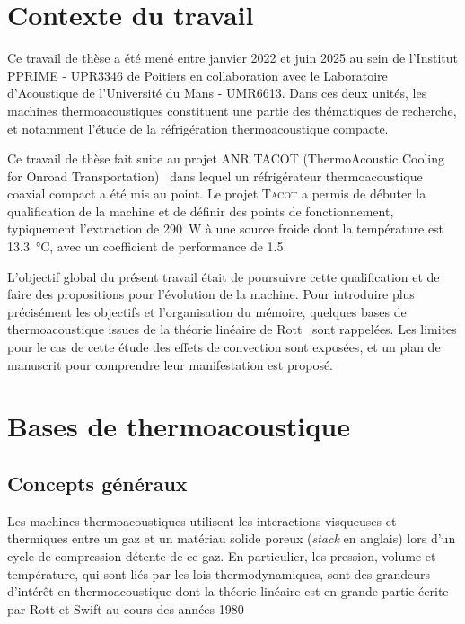 \section{Contexte du travail}
Ce travail de thèse a été mené entre janvier 2022 et juin 2025 au sein de l'Institut PPRIME - UPR3346 de Poitiers en collaboration avec le Laboratoire d'Acoustique de l'Université du Mans - UMR6613. Dans ces deux unités, les machines thermoacoustiques constituent une partie des thématiques de recherche, et notamment l'étude de la réfrigération thermoacoustique compacte.\medskip

Ce travail de thèse fait suite au projet ANR \textsc{TACOT} (ThermoAcoustic Cooling for Onroad Transportation)~\cite{ANR_thermo-acoustic_2019, ramadan_design_2021} dans lequel un réfrigérateur thermoacoustique coaxial compact a été mis au point. Le projet \textsc{Tacot} a permis de débuter la qualification de la machine et de définir des points de  fonctionnement, typiquement l'extraction de \qty{290}{\watt} à une source froide dont la température est \qty{13.3}{\degreeCelsius}, avec un coefficient de performance de \num{1.5}.\medskip

L'objectif global du présent travail était de poursuivre cette qualification et de faire des propositions pour l'évolution de la machine. Pour introduire plus précisément les objectifs et l'organisation du mémoire, quelques bases de thermoacoustique issues de la théorie linéaire de Rott~\cite{rott_damped_1969, rott_thermoacoustics_1980} sont rappelées. Les limites pour le cas de cette étude des effets de convection sont exposées, et un plan de manuscrit pour comprendre leur manifestation est proposé.

\section{Bases de thermoacoustique}
\subsection{Concepts généraux}
Les machines thermoacoustiques utilisent les interactions visqueuses et thermiques entre un gaz et un matériau solide poreux (\textit{stack} en anglais) lors d’un cycle de compression-détente de ce gaz. En particulier, les pression, volume et température, qui sont liés par les lois thermodynamiques, sont des grandeurs d’intérêt en thermoacoustique dont la théorie linéaire est en grande partie écrite par Rott et Swift au cours des années 1980 \cite{rott_damped_1969, rott_thermally_1973, rott_thermally_1975, rott_thermally_1976, zouzoulas_thermally_1976, rott_thermoacoustics_1980, muller_thermally_1983}

